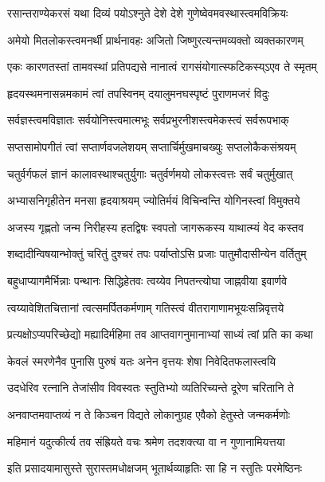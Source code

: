 \twolineshloka
{रसान्तराण्येकरसं यथा दिव्यं पयोऽश्नुते}
{देशे देशे गुणेष्वेवमवस्थास्त्वमविक्रियः} %

\twolineshloka
{अमेयो मितलोकस्त्वमनर्थी प्रार्थनावहः}
{अजितो जिष्णुरत्यन्तमव्यक्तो व्यक्तकारणम्} %

\twolineshloka
{एकः कारणतस्तां तामवस्थां प्रतिपद्यसे}
{नानात्वं रागसंयोगात्स्फटिकस्य्ऽएव ते स्मृतम्} %

\twolineshloka
{हृदयस्थमनासन्नमकामं त्वां तपस्विनम्}
{दयालुमनघस्पृष्टं पुराणमजरं विदुः} %

\twolineshloka
{सर्वज्ञस्त्वमविज्ञातः सर्वयोनिस्त्वमात्मभूः}
{सर्वप्रभुरनीशस्त्वमेकस्त्वं सर्वरूपभाक्} %

\twolineshloka
{सप्तसामोपगीतं त्वां सप्तार्णवजलेशयम्}
{सप्तार्चिर्मुखमाचख्युः सप्तलोकैकसंश्रयम्} %

\twolineshloka
{चतुर्वर्गफलं ज्ञानं कालावस्थाश्चतुर्युगाः}
{चतुर्वर्णमयो लोकस्त्वत्तः सर्वं चतुर्मुखात्} %

\twolineshloka
{अभ्यासनिगृहीतेन मनसा हृदयाश्रयम्}
{ज्योतिर्मयं विचिन्वन्ति योगिनस्त्वां विमुक्तये} %

\twolineshloka
{अजस्य गृह्णतो जन्म निरीहस्य हतद्विषः}
{स्वपतो जागरूकस्य याथात्म्यं वेद कस्तव} %

\twolineshloka
{शब्दादीन्विषयान्भोक्तुं चरितुं दुश्चरं तपः}
{पर्याप्तोऽसि प्रजाः पातुमौदासीन्येन वर्तितुम्} %

\twolineshloka
{बहुधाप्यागमैर्भिन्नाः पन्थानः सिद्धिहेतवः}
{त्वय्येव निपतन्त्योघा जाह्नवीया इवार्णवे} %

\twolineshloka
{त्वय्यावेशितचित्तानां त्वत्समर्पितकर्मणाम्}
{गतिस्त्वं वीतरागाणामभूयःसन्निवृत्तये} %

\twolineshloka
{प्रत्यक्षोऽप्यपरिच्छेद्यो मह्यादिर्महिमा तव}
{आप्तवागनुमानाभ्यां साध्यं त्वां प्रति का कथा} %

\twolineshloka
{केवलं स्मरणेनैव पुनासि पुरुषं यतः}
{अनेन वृत्तयः शेषा निवेदितफलास्त्वयि} %

\twolineshloka
{उदधेरिव रत्नानि तेजांसीव विवस्वतः}
{स्तुतिभ्यो व्यतिरिच्यन्ते दूरेण चरितानि ते} %

\twolineshloka
{अनवाप्तमवाप्तव्यं न ते किञ्चन विद्यते}
{लोकानुग्रह एवैको हेतुस्ते जन्मकर्मणोः} %

\twolineshloka
{महिमानं यदुत्कीर्त्य तव संह्रियते वचः}
{श्रमेण तदशक्त्या वा न गुणानामियत्तया} %

\twolineshloka
{इति प्रसादयामासुस्ते सुरास्तमधोक्षजम्}
{भूतार्थव्याहृतिः सा हि न स्तुतिः परमेष्ठिनः} %

